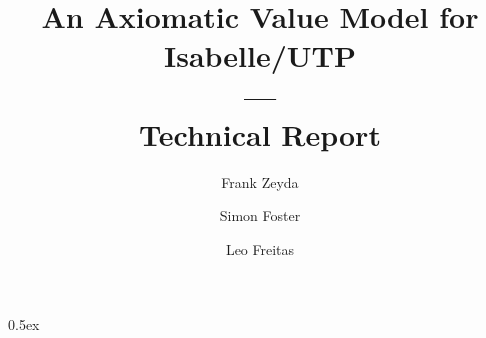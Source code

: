 \documentclass[11pt,a4paper]{article}
\begin{document}

\title{An Axiomatic Value Model for Isabelle/UTP\\---\\Technical Report}

\author{Frank Zeyda \and Simon Foster \and Leo Freitas}

\maketitle

\tableofcontents

\newpage

\parindent 0pt\parskip 0.5ex


%


\newpage

%

%


\newpage


\newpage


\newpage


\newpage


\newpage


\newpage


\newpage


\newpage


\newpage


\newpage


\newpage

%


\newpage


\newpage


\newpage


\newpage


\newpage

\end{document}

